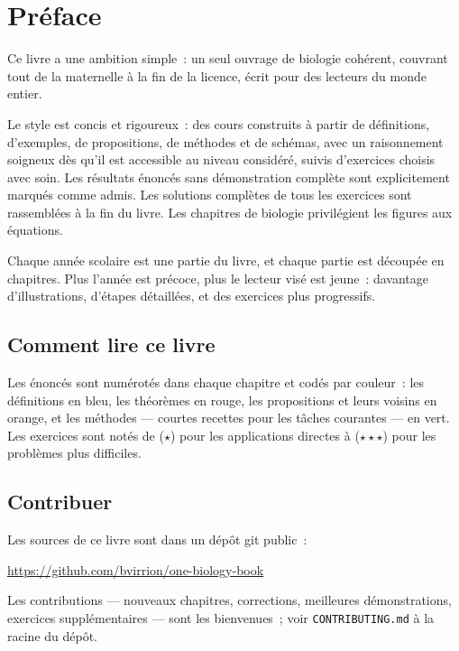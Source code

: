 \chapter{Préface}

Ce livre a une ambition simple~: un seul ouvrage de biologie cohérent,
couvrant tout de la maternelle à la fin de la licence, écrit pour des
lecteurs du monde entier.

Le style est concis et rigoureux~: des cours construits à partir de
définitions, d'exemples, de propositions, de méthodes et de schémas, avec un
raisonnement soigneux dès qu'il est accessible au niveau considéré, suivis
d'exercices choisis avec soin. Les résultats énoncés sans démonstration
complète sont explicitement marqués comme admis. Les solutions complètes de
tous les exercices sont rassemblées à la fin du livre. Les chapitres de
biologie privilégient les figures aux équations.

Chaque année scolaire est une partie du livre, et chaque partie est découpée
en chapitres. Plus l'année est précoce, plus le lecteur visé est jeune~:
davantage d'illustrations, d'étapes détaillées, et des exercices plus progressifs.

\section*{Comment lire ce livre}

Les énoncés sont numérotés dans chaque chapitre et codés par couleur~: les
définitions en bleu, les théorèmes en rouge, les propositions et leurs
voisins en orange, et les méthodes --- courtes recettes pour les tâches
courantes --- en vert. Les exercices sont notés de ($\star$) pour les
applications directes à ($\star\star\star$) pour les problèmes plus
difficiles.

\section*{Contribuer}

Les sources de ce livre sont dans un dépôt git public~:
\begin{center}
\url{https://github.com/bvirrion/one-biology-book}
\end{center}
Les contributions --- nouveaux chapitres, corrections, meilleures
démonstrations, exercices supplémentaires --- sont les bienvenues~; voir
\texttt{CONTRIBUTING.md} à la racine du dépôt.
